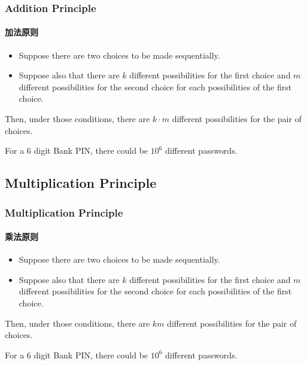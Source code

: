 \documentclass[
	11pt, %
	handout,
]{beamer}
\begin{document}
\begin{frame}
	\frametitle{Addition Principle} %
	\framesubtitle{加法原则}
	\begin{definition}
		\begin{itemize}
			\item Suppose there are two choices to be made sequentially.
			\item Suppose also that there are $k$ different possibilities for the first choice and $m$ different possibilities for the second choice for each possibilities of the first choice. 
		\end{itemize}
				Then, \alert{under those conditions}, there are $k\cdot m$ different possibilities for the pair of choices.
	\end{definition}
	\begin{example}
	For a 6 digit Bank PIN, there could be $10^6$ different passwords. 
	\end{example}
\end{frame}


\subsection{Multiplication Principle}


\begin{frame}
	\frametitle{Multiplication Principle} %
	\framesubtitle{乘法原则}
	\begin{definition}
		\begin{itemize}
			\item Suppose there are two choices to be made sequentially.
			\item Suppose also that there are $k$ different possibilities for the first choice and $m$ different possibilities for the second choice for each possibilities of the first choice. 
		\end{itemize}
				Then, \alert{under those conditions}, there are $km$ different possibilities for the pair of choices.
	\end{definition}
	\begin{example}
	For a 6 digit Bank PIN, there could be $10^6$ different passwords. 
	\end{example}
\end{frame}
\end{document}
